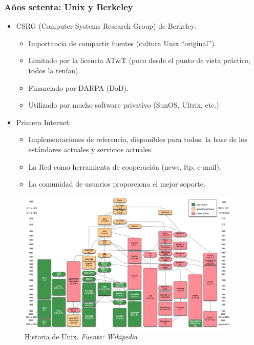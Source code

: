 \documentclass{beamer}
\begin{document}

\begin{frame}
\frametitle{Años setenta: Unix y Berkeley}

\begin{itemize}

\item CSRG (Computer Systems Research Group) de Berkeley:
	\begin{itemize}
	\item Importancia de compartir fuentes (cultura Unix ``original'').
	\item Limitado por la licencia AT\&T (poco desde el punto de vista práctico, todos la tenían).
	\item Financiado por DARPA (DoD).
	\item Utilizado por mucho software privativo (SunOS, Ultrix, etc.)
	\end{itemize}

\item Primera Internet:
	\begin{itemize}
	\item Implementaciones de referencia, disponibles para todos: la base de los estándares actuales y servicios actuales.
	\item La Red como herramienta de cooperación (news, ftp, e-mail).
	\item La comunidad de usuarios proporciona el mejor soporte.
	\end{itemize}

\end{itemize}

\end{frame}


\begin{frame}


\begin{figure}[h]

\begin{center}
  \includegraphics[height=2.7in]{figs/Unix_history-simple.png}
  \caption{{\footnotesize Historia de Unix. \textit{Fuente: Wikipedia}}}
\end{center}
\end{figure}


\end{frame}
\end{document}
